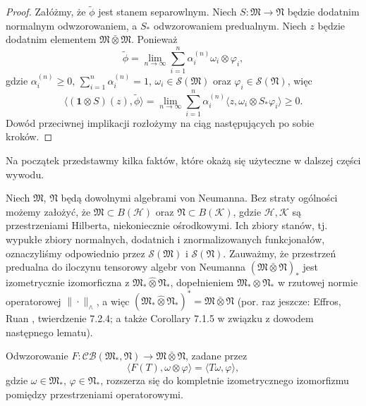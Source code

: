 \begin{proof}


Załóżmy, że $\tilde{\phi}$ jest stanem separowlnym.
Niech $S: \mathfrak{M} \rightarrow \mathfrak{N}$ będzie
dodatnim normalnym odwzorowaniem, a $S_*$ odwzorowaniem predualnym.
Niech $z$ będzie dodatnim elementem
$\mathfrak{M} \bar{\otimes} \mathfrak{M}$.
Ponieważ
\begin{equation}
    \tilde{\phi} =\lim \limits_{n \rightarrow \infty}
\sum_{i=1}^{n}\alpha_i^{(n)} \omega_{i} \otimes \varphi_{i},
\end{equation}
gdzie
$\alpha_i^{(n)}\geq 0$, $\sum_{i=1}^n\alpha_i^{(n)}=1$,
$\omega_{i}\in\mathcal{S}(\mathfrak{M})$
oraz
$\varphi_{i}\in\mathcal{S}(\mathfrak{N})$,
więc
\begin{equation}
 \langle (\mathbf{1} \otimes S)(z), \tilde{\phi} \rangle =
 \lim \limits_{n \rightarrow \infty}\sum \limits_{i = 1}^{n}\alpha_i^{(n)}
 \langle z, \omega_{i} \otimes S_{*} \varphi_{i} \rangle \geq 0.
\end{equation}
Dowód przeciwnej implikacji rozłożymy na ciąg następujących po sobie kroków.
\end{proof}

Na początek przedstawmy kilka faktów, które okażą się użyteczne w dalszej
części wywodu.

Niech  $\mathfrak{M}$, $\mathfrak{N}$
będą dowolnymi algebrami von Neumanna.
Bez straty ogólności możemy założyć, że
$\mathfrak{M}\subset B(\mathcal{H})$ oraz $\mathfrak{N}\subset B(\mathcal{K})$,
gdzie  $\mathcal{H},\mathcal{K}$
są przestrzeniami Hilberta, niekoniecznie ośrodkowymi.
Ich zbiory stanów, tj. wypukłe zbiory normalnych, dodatnich i znormalizowanych
funkcjonałów, oznaczyliśmy odpowiednio przez
$\mathcal{S}(\mathfrak{M})$ i $\mathcal{S}(\mathfrak{N})$.
Zauważmy, że przestrzeń predualna do iloczynu tensorowy algebr von Neumanna
$(\mathfrak{M} \bar{\otimes} \mathfrak{N})_{*}$
jest izometrycznie izomorficzna z
$\mathfrak{M}_*\hat{\otimes}\mathfrak{N}_*$, dopełnieniem
$\mathfrak{M}_*\otimes\mathfrak{N}_*$ w rzutowej normie operatorowej
$\|\cdot\|_\wedge$,
a więc $(\mathfrak{M}_*\hat{\otimes}\mathfrak{N}_*)^*= \mathfrak{M} \bar{\otimes} \mathfrak{N}$
(por. raz jeszcze: Effros, Ruan \cite{Effros2000}, twierdzenie 7.2.4;
a także Corollary 7.1.5 w związku z dowodem następnego lematu).
\begin{Lemma}
\label{thm:isometry}
Odwzorowanie $F: \mathcal{CB}(\mathfrak{M}_{*}, \mathfrak{N})
\rightarrow \mathfrak{M} \bar{\otimes} \mathfrak{N}$,
zadane przez
\begin{equation}
\langle F(T), \omega \otimes \varphi \rangle =\langle T\omega, \varphi \rangle,
\end{equation}
gdzie $\omega \in \mathfrak{M}_{*}$, $\varphi \in \mathfrak{N}_{*}$,
rozszerza się do kompletnie izometrycznego izomorfizmu pomiędzy przestrzeniami
operatorowymi.
\end{Lemma}

